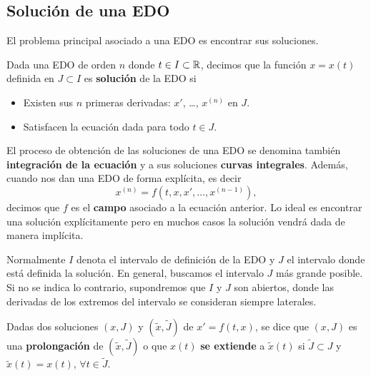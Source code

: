 \subsection{Solución de una EDO}
El problema principal asociado a una EDO es encontrar sus soluciones. 
\begin{definition}
Dada una EDO de orden $\displaystyle n $ donde $\displaystyle t \in I \subset \mathbb{R} $, decimos que la función $\displaystyle x = x\left(t\right) $ definida en $\displaystyle J \subset I $ es \textbf{solución} de la EDO si
\begin{itemize}
\item Existen sus $\displaystyle n $ primeras derivadas: $\displaystyle x' $, \ldots, $\displaystyle x^{\left(n\right)} $ en $\displaystyle J $. 
\item Satisfacen la ecuación dada para todo $\displaystyle t \in J $.
\end{itemize}
\end{definition}
El proceso de obtención de las soluciones de una EDO se denomina también \textbf{integración de la ecuación} y a sus soluciones \textbf{curvas integrales}. Además, cuando nos dan una EDO de forma explícita, es decir
\[x^{\left(n\right)} = f\left(t, x, x', \ldots, x^{\left(n-1\right)}\right) ,\]
decimos que $\displaystyle f $ es el \textbf{campo} asociado a la ecuación anterior. Lo ideal es encontrar una solución explícitamente pero en muchos casos la solución vendrá dada de manera implícita.
\begin{notation}
Normalmente $\displaystyle I $ denota el intervalo de definición de la EDO y $\displaystyle J $ el intervalo donde está definida la solución. En general, buscamos el intervalo $\displaystyle J $ más grande posible. Si no se indica lo contrario, supondremos que $\displaystyle I $ y $\displaystyle J $ son abiertos, donde las derivadas de los extremos del intervalo se consideran siempre laterales.
\end{notation}
\begin{definition}
	Dadas dos soluciones $\displaystyle \left(x,J\right) $ y $\displaystyle \left(\tilde{x}, \tilde{J}\right) $ de $\displaystyle x' = f\left(t,x\right) $, se dice que $\displaystyle \left(x,J\right) $ es una \textbf{prolongación} de $\displaystyle \left(\tilde{x}, \tilde{J}\right) $ o que $\displaystyle x\left(t\right) $ \textbf{se extiende} a $\displaystyle \tilde{x}\left(t\right) $ si $\displaystyle \tilde{J} \subset J $ y $\displaystyle \tilde{x}\left(t\right) = x\left(t\right) $, $\displaystyle \forall t \in \tilde{J} $.
\end{definition}
